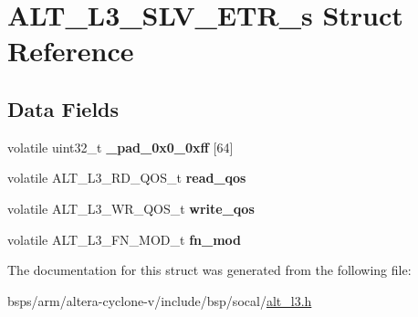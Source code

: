 \hypertarget{structALT__L3__SLV__ETR__s}{}\section{A\+L\+T\+\_\+\+L3\+\_\+\+S\+L\+V\+\_\+\+E\+T\+R\+\_\+s Struct Reference}
\label{structALT__L3__SLV__ETR__s}
\subsection*{Data Fields}
\begin{DoxyCompactItemize}
\item 
\mbox{\label{structALT__L3__SLV__ETR__s_abf442cac9f0d0df657e58f2b128e7223}} 
volatile uint32\+\_\+t {\bfseries \+\_\+pad\+\_\+0x0\+\_\+0xff} \mbox{[}64\mbox{]}
\item 
\mbox{\label{structALT__L3__SLV__ETR__s_a6efc9b0660045fb5e145bbdcb6e5bfc5}} 
volatile A\+L\+T\+\_\+\+L3\+\_\+\+R\+D\+\_\+\+Q\+O\+S\+\_\+t {\bfseries read\+\_\+qos}
\item 
\mbox{\label{structALT__L3__SLV__ETR__s_a519ecca0f16253d49c7694c2a809da17}} 
volatile A\+L\+T\+\_\+\+L3\+\_\+\+W\+R\+\_\+\+Q\+O\+S\+\_\+t {\bfseries write\+\_\+qos}
\item 
\mbox{\label{structALT__L3__SLV__ETR__s_a987c1dd1934993bcd126ee40eeaf47bb}} 
volatile A\+L\+T\+\_\+\+L3\+\_\+\+F\+N\+\_\+\+M\+O\+D\+\_\+t {\bfseries fn\+\_\+mod}
\end{DoxyCompactItemize}


The documentation for this struct was generated from the following file\+:\begin{DoxyCompactItemize}
\item 
bsps/arm/altera-\/cyclone-\/v/include/bsp/socal/\mbox{\hyperlink{alt__l3_8h}{alt\+\_\+l3.\+h}}\end{DoxyCompactItemize}

